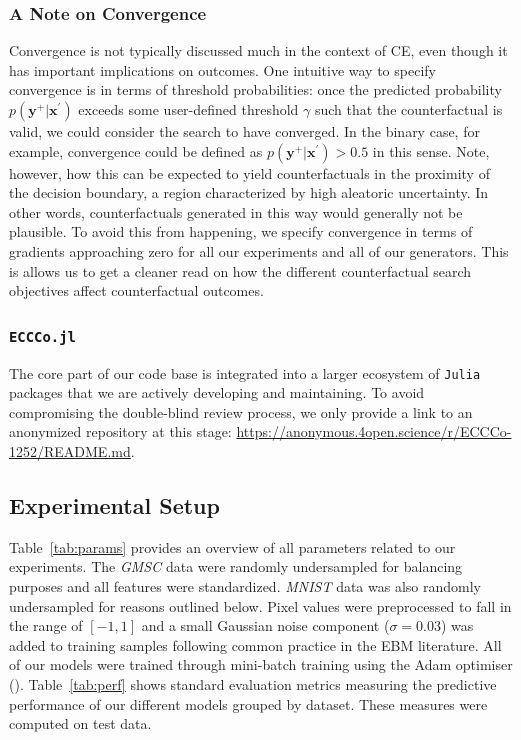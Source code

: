 \subsubsection{A Note on Convergence}\label{convergence}

Convergence is not typically discussed much in the context of CE, even though it has important implications on outcomes. One intuitive way to specify convergence is in terms of threshold probabilities: once the predicted probability $p(\mathbf{y}^+|\mathbf{x}^{\prime})$ exceeds some user-defined threshold $\gamma$ such that the counterfactual is valid, we could consider the search to have converged. In the binary case, for example, convergence could be defined as $p(\mathbf{y}^+|\mathbf{x}^{\prime})>0.5$ in this sense. Note, however, how this can be expected to yield counterfactuals in the proximity of the decision boundary, a region characterized by high aleatoric uncertainty. In other words, counterfactuals generated in this way would generally not be plausible. To avoid this from happening, we specify convergence in terms of gradients approaching zero for all our experiments and all of our generators. This is allows us to get a cleaner read on how the different counterfactual search objectives affect counterfactual outcomes. 

\subsubsection{\texttt{ECCCo.jl}}

The core part of our code base is integrated into a larger ecosystem of \texttt{Julia} packages that we are actively developing and maintaining. To avoid compromising the double-blind review process, we only provide a link to an anonymized repository at this stage: \url{https://anonymous.4open.science/r/ECCCo-1252/README.md}. 

\subsection{Experimental Setup}\label{app:setup}

Table~\ref{tab:params} provides an overview of all parameters related to our experiments. The \textit{GMSC} data were randomly undersampled for balancing purposes and all features were standardized. \textit{MNIST} data was also randomly undersampled for reasons outlined below. Pixel values were preprocessed to fall in the range of $[-1,1]$ and a small Gaussian noise component ($\sigma=0.03$) was added to training samples following common practice in the EBM literature. All of our models were trained through mini-batch training using the Adam optimiser (\citet{kingma2014adam}). Table~\ref{tab:perf} shows standard evaluation metrics measuring the predictive performance of our different models grouped by dataset. These measures were computed on test data. 

